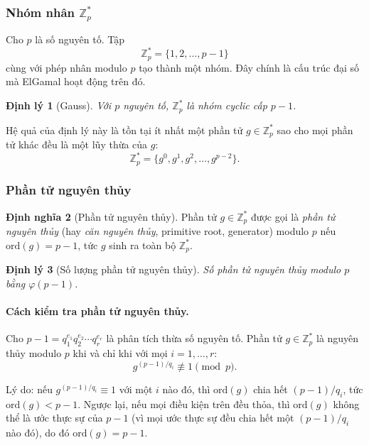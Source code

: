 \documentclass[12pt,a4paper]{report}
\newtheorem{theorem}{Định lý}[chapter]
\theoremstyle{definition}
\newtheorem{definition}[theorem]{Định nghĩa}
\theoremstyle{remark}
\begin{document}
\subsubsection{Nhóm nhân \texorpdfstring{$\mathbb{Z}_p^*$}{Zp*}}

Cho $p$ là số nguyên tố. Tập
\[
\mathbb{Z}_p^* = \{1, 2, \ldots, p-1\}
\]
cùng với phép nhân modulo $p$ tạo thành một nhóm. Đây chính là cấu trúc đại số mà ElGamal hoạt động trên đó.

\begin{theorem}[Gauss]
\label{thm:zp-cyclic}
Với $p$ nguyên tố, $\mathbb{Z}_p^*$ là nhóm cyclic cấp $p - 1$.
\end{theorem}

Hệ quả của định lý này là tồn tại ít nhất một phần tử $g \in \mathbb{Z}_p^*$ sao cho mọi phần tử khác đều là một lũy thừa của $g$:
\[
\mathbb{Z}_p^* = \{g^0, g^1, g^2, \ldots, g^{p-2}\}.
\]

\subsubsection{Phần tử nguyên thủy}

\begin{definition}[Phần tử nguyên thủy]
Phần tử $g \in \mathbb{Z}_p^*$ được gọi là \emph{phần tử nguyên thủy} (hay \emph{căn nguyên thủy}, primitive root, generator) modulo $p$ nếu $\mathrm{ord}(g) = p - 1$, tức $g$ sinh ra toàn bộ $\mathbb{Z}_p^*$.
\end{definition}

\begin{theorem}[Số lượng phần tử nguyên thủy]
Số phần tử nguyên thủy modulo $p$ bằng $\varphi(p-1)$.
\end{theorem}

\paragraph{Cách kiểm tra phần tử nguyên thủy.}
Cho $p - 1 = q_1^{e_1} q_2^{e_2} \cdots q_r^{e_r}$ là phân tích thừa số nguyên tố. Phần tử $g \in \mathbb{Z}_p^*$ là nguyên thủy modulo $p$ khi và chỉ khi với mọi $i = 1, \ldots, r$:
\[
g^{(p-1)/q_i} \not\equiv 1 \pmod{p}.
\]

Lý do: nếu $g^{(p-1)/q_i} \equiv 1$ với một $i$ nào đó, thì $\mathrm{ord}(g)$ chia hết $(p-1)/q_i$, tức $\mathrm{ord}(g) < p-1$. Ngược lại, nếu mọi điều kiện trên đều thỏa, thì $\mathrm{ord}(g)$ không thể là ước thực sự của $p-1$ (vì mọi ước thực sự đều chia hết một $(p-1)/q_i$ nào đó), do đó $\mathrm{ord}(g) = p-1$.
\end{document}
